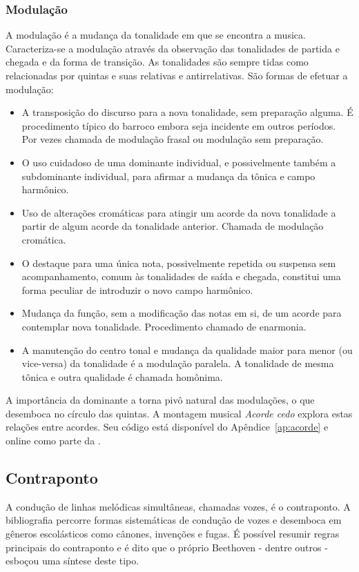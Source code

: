 \subsubsection{Modulação}
A modulação é a mudança da tonalidade em que se encontra a musica. Caracteriza-se a modulação através da observação
das tonalidades de partida e chegada e da forma de transição. As tonalidades são sempre tidas como relacionadas por quintas e suas relativas e antirrelativas. São formas de efetuar a modulação:
\begin{itemize}
    \item A transposição do discurso para a nova tonalidade, sem preparação alguma. É procedimento típico do barroco embora seja incidente em outros períodos. Por vezes chamada de modulação frasal ou modulação sem preparação.
    \item O uso cuidadoso de uma dominante individual, e possivelmente também a subdominante individual, para afirmar a mudança da tônica e campo harmônico.
    \item Uso de alterações cromáticas para atingir um acorde da nova tonalidade a partir de algum acorde da tonalidade anterior. Chamada de modulação cromática.
    \item O destaque para uma única nota, possivelmente repetida ou suspensa sem acompanhamento, comum às tonalidades de saída e chegada, constitui uma forma peculiar de introduzir o novo campo harmônico.
    \item Mudança da função, sem a modificação das notas em si, de um acorde para contemplar nova tonalidade. Procedimento chamado de enarmonia.
    \item A manutenção do centro tonal e mudança da qualidade maior para menor (ou vice-versa) da tonalidade é a modulação paralela. A tonalidade de mesma tônica e outra qualidade é chamada homônima.
\end{itemize}

A importância da dominante a torna pivô natural das modulações, o que desemboca no círculo das quintas.\cite{Harmonia,Salzer,Koellheuteur,Harmony} A montagem musical \emph{Acorde cedo} explora estas relações entre acordes. Seu código está disponível do Apêndice~\ref{ap:acorde} e online como parte da \massa.\cite{MASSA}


\subsection{Contraponto}\label{subsec:contraponto}

A condução de linhas melódicas simultâneas, chamadas vozes,
é o contraponto. A bibliografia
percorre formas sistemáticas de condução de vozes e desemboca em gêneros escolásticos como cânones, invenções e fugas. É possível resumir regras principais do contraponto e é dito que o próprio Beethoven - dentre outros - esboçou uma síntese deste tipo.

